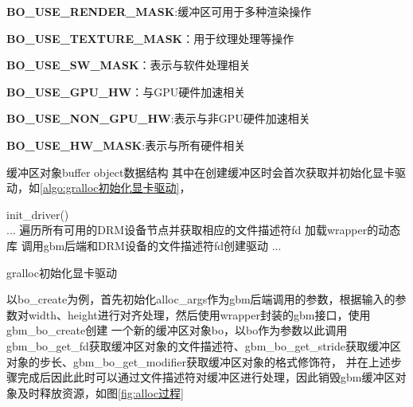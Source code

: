 \textbf{BO\_USE\_RENDER\_MASK}:缓冲区可用于多种渲染操作

\textbf{BO\_USE\_TEXTURE\_MASK}：用于纹理处理等操作

\textbf{BO\_USE\_SW\_MASK}：表示与软件处理相关

\textbf{BO\_USE\_GPU\_HW}：与GPU硬件加速相关

\textbf{BO\_USE\_NON\_GPU\_HW}:表示与非GPU硬件加速相关

\textbf{BO\_USE\_HW\_MASK}:表示与所有硬件相关











缓冲区对象buffer object数据结构
其中在创建缓冲区时会首次获取并初始化显卡驱动，如\ref{algo:gralloc初始化显卡驱动}，

\begin{algorithm}[H]
  \SetAlgoLined
  init\_driver(){\\
    ...
    遍历所有可用的DRM设备节点并获取相应的文件描述符fd\;
    加载wrapper的动态库\;
    调用gbm后端和DRM设备的文件描述符fd创建驱动\;
    ...\;
  }
  \caption{gralloc初始化显卡驱动}
  \label{algo:gralloc初始化显卡驱动}
\end{algorithm}

以bo\_create为例，首先初始化alloc\_args作为gbm后端调用的参数，根据输入的参数对width、height进行对齐处理，然后使用wrapper封装的gbm接口，使用gbm\_bo\_create创建
一个新的缓冲区对象bo，以bo作为参数以此调用gbm\_bo\_get\_fd获取缓冲区对象的文件描述符、gbm\_bo\_get\_stride获取缓冲区对象的步长、gbm\_bo\_get\_modifier获取缓冲区对象的格式修饰符，
并在上述步骤完成后因此此时可以通过文件描述符对缓冲区进行处理，因此销毁gbm缓冲区对象及时释放资源，如图\ref{fig:alloc过程}


